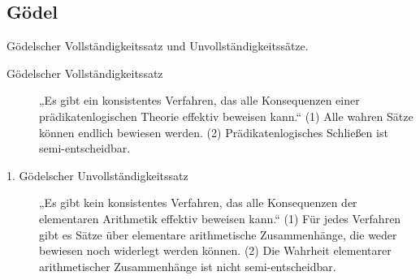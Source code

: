 \subsection{Gödel}
    Gödelscher Vollständigkeitssatz und Unvollständigkeitssätze. 
    \begin{description}
        \item[Gödelscher Vollständigkeitssatz] „Es gibt ein konsistentes Verfahren, das alle Konsequenzen einer prädikatenlogischen Theorie effektiv beweisen kann.“ (1) Alle wahren Sätze können endlich bewiesen werden. (2) Prädikatenlogisches Schließen ist semi-entscheidbar.
        \item[1. Gödelscher Unvollständigkeitssatz] „Es gibt kein konsistentes Verfahren, das alle Konsequenzen der elementaren Arithmetik effektiv beweisen kann.“ (1) Für jedes Verfahren gibt es Sätze über elementare arithmetische Zusammenhänge, die weder bewiesen noch widerlegt werden können. (2) Die Wahrheit elementarer arithmetischer Zusammenhänge ist nicht semi-entscheidbar.
    \end{description}

